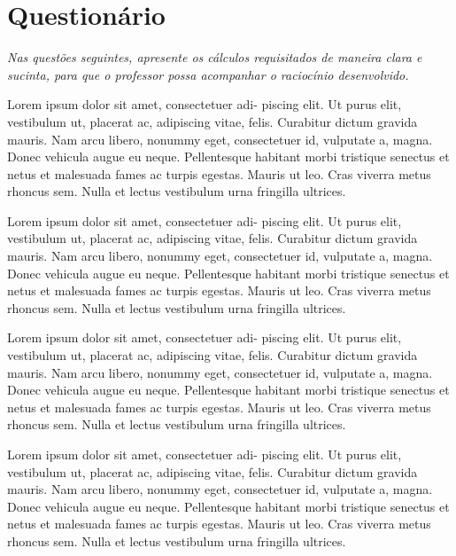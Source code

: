 \vspace{5mm}

\section{Questionário}
\emph{Nas questões seguintes, apresente os cálculos requisitados de maneira clara e sucinta, para que o professor possa acompanhar o raciocínio desenvolvido.}
\vspace{5mm}

\begin{question}[type={exam}]{2}
Lorem ipsum dolor sit amet, consectetuer adi-
piscing elit. Ut purus elit, vestibulum ut, placerat ac, adipiscing vitae,
felis. Curabitur dictum gravida mauris. Nam arcu libero, nonummy
eget, consectetuer id, vulputate a, magna. Donec vehicula augue
eu neque. Pellentesque habitant morbi tristique senectus et netus
et malesuada fames ac turpis egestas. Mauris ut leo. Cras viverra
metus rhoncus sem. Nulla et lectus vestibulum urna fringilla ultrices.
\end{question}

\begin{question}[type={exam}]{2}
Lorem ipsum dolor sit amet, consectetuer adi-
piscing elit. Ut purus elit, vestibulum ut, placerat ac, adipiscing vitae,
felis. Curabitur dictum gravida mauris. Nam arcu libero, nonummy
eget, consectetuer id, vulputate a, magna. Donec vehicula augue
eu neque. Pellentesque habitant morbi tristique senectus et netus
et malesuada fames ac turpis egestas. Mauris ut leo. Cras viverra
metus rhoncus sem. Nulla et lectus vestibulum urna fringilla ultrices.
\end{question}

\begin{question}[type={exam}]{2}
Lorem ipsum dolor sit amet, consectetuer adi-
piscing elit. Ut purus elit, vestibulum ut, placerat ac, adipiscing vitae,
felis. Curabitur dictum gravida mauris. Nam arcu libero, nonummy
eget, consectetuer id, vulputate a, magna. Donec vehicula augue
eu neque. Pellentesque habitant morbi tristique senectus et netus
et malesuada fames ac turpis egestas. Mauris ut leo. Cras viverra
metus rhoncus sem. Nulla et lectus vestibulum urna fringilla ultrices.
\end{question}

\begin{question}[type={exam}]{2}
Lorem ipsum dolor sit amet, consectetuer adi-
piscing elit. Ut purus elit, vestibulum ut, placerat ac, adipiscing vitae,
felis. Curabitur dictum gravida mauris. Nam arcu libero, nonummy
eget, consectetuer id, vulputate a, magna. Donec vehicula augue
eu neque. Pellentesque habitant morbi tristique senectus et netus
et malesuada fames ac turpis egestas. Mauris ut leo. Cras viverra
metus rhoncus sem. Nulla et lectus vestibulum urna fringilla ultrices.
\end{question}

